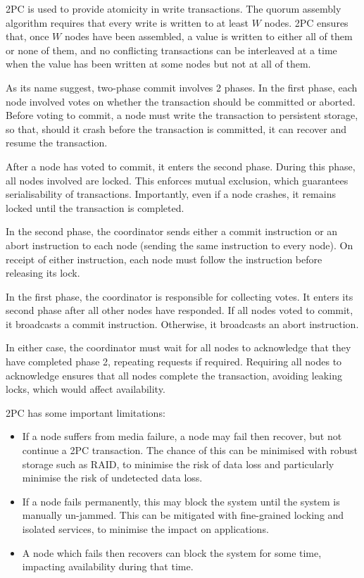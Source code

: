 \documentclass[12pt,a4paper,twoside,openany]{report}
\begin{document}
2PC is used to provide atomicity in write transactions. The quorum assembly algorithm requires that every write is written to at least $W$ nodes. 2PC ensures that, once $W$ nodes have been assembled, a value is written to either all of them or none of them, and no conflicting transactions can be interleaved at a time when the value has been written at some nodes but not at all of them.

As its name suggest, two-phase commit involves 2 phases. In the first phase, each node involved votes on whether the transaction should be committed or aborted. Before voting to commit, a node must write the transaction to persistent storage, so that, should it crash before the transaction is committed, it can recover and resume the transaction.

After a node has voted to commit, it enters the second phase. During this phase, all nodes involved are locked. This enforces mutual exclusion, which guarantees serialisability of transactions. Importantly, even if a node crashes, it remains locked until the transaction is completed.

In the second phase, the coordinator sends either a commit instruction or an abort instruction to each node (sending the same instruction to every node). On receipt of either instruction, each node must follow the instruction before releasing its lock.

In the first phase, the coordinator is responsible for collecting votes. It enters its second phase after all other nodes have responded. If all nodes voted to commit, it broadcasts a commit instruction. Otherwise, it broadcasts an abort instruction.

In either case, the coordinator must wait for all nodes to acknowledge that they have completed phase 2, repeating requests if required. Requiring all nodes to acknowledge ensures that all nodes complete the transaction, avoiding leaking locks, which would affect availability.

2PC has some important limitations:

\begin{itemize}
\item
If a node suffers from media failure, a node may fail then recover, but not continue a 2PC transaction. The chance of this can be minimised with robust storage such as RAID, to minimise the risk of data loss and particularly minimise the risk of undetected data loss.

\item
If a node fails permanently, this may block the system until the system is manually un-jammed. This can be mitigated with fine-grained locking and isolated services, to minimise the impact on applications.

\item
A node which fails then recovers can block the system for some time, impacting availability during that time.

\end{itemize}
\end{document}
